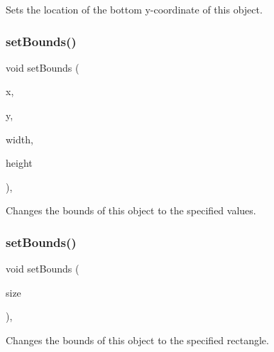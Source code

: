 Sets the location of the bottom y-\/coordinate of this object. 

\mbox{\label{classGObject_a2aae8197624b72265ab83b4f1bc73f2f}} 
\subsubsection{\texorpdfstring{set\+Bounds()}{setBounds()}\hspace{0.1cm}{\footnotesize\ttfamily [1/2]}}
{\footnotesize\ttfamily void set\+Bounds (\begin{DoxyParamCaption}\item[{double}]{x,  }\item[{double}]{y,  }\item[{double}]{width,  }\item[{double}]{height }\end{DoxyParamCaption})\hspace{0.3cm}{\ttfamily [virtual]}, {\ttfamily [inherited]}}



Changes the bounds of this object to the specified values. 

\mbox{\label{classGObject_acada386653f008cacc7cce86426bef7c}} 
\subsubsection{\texorpdfstring{set\+Bounds()}{setBounds()}\hspace{0.1cm}{\footnotesize\ttfamily [2/2]}}
{\footnotesize\ttfamily void set\+Bounds (\begin{DoxyParamCaption}\item[{const \mbox{\hyperlink{classGRectangle}{G\+Rectangle}} \&}]{size }\end{DoxyParamCaption})\hspace{0.3cm}{\ttfamily [virtual]}, {\ttfamily [inherited]}}



Changes the bounds of this object to the specified rectangle. 

\mbox{\label{classGObject_a290b47dd8de1be44089f95cb2c47c1de}} 
